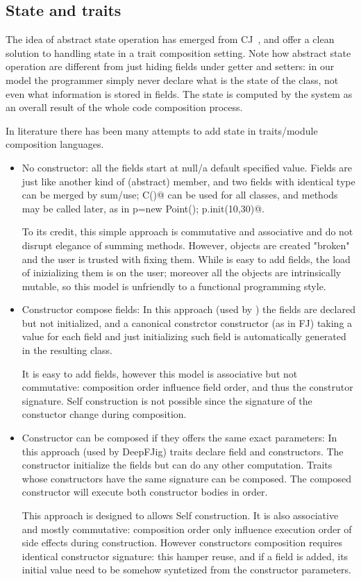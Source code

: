 \subsection{State and traits}

The idea of abstract state operation has emerged from CJ~\cite{wang2016classless}, and offer a clean solution to handling state
in a trait composition setting.
Note how abstract state operation are different from just hiding fields under getter and setters: 
in our model the programmer simply never declare what is the state of the class, not even what information is stored in fields.
The state is computed by the system as an overall result of the whole code composition process.

In literature there has been many attempts to add state in traits/module composition languages.
\begin{itemize}  
\item No constructor: all the fields start at null/a default specified value.
  Fields are just like another kind of (abstract) member, and two fields
  with identical type can be merged by sum/use; \Q@new C()@ can be used for all classes, and \Q@init@ methods may be called later, as in
  \Q@Point p=new Point(); p.init(10,30)@.
  
  To its credit, this simple approach is commutative and associative and do not disrupt elegance of summing methods.
  However, objects are created "broken" and the user is trusted with fixing them.
  While is easy to add fields, the load of inizializing them is on the user; moreover
    all the objects are intrinsically mutable, so this model is unfriendly
    to a functional programming style.
\item Constructor compose fields:
In this approach (used by \cite{FJig}) the fields are declared but not initialized, and
a canonical constrctor constructor (as in FJ) taking a value for each field and just initializing such field
is automatically generated in the resulting class.

It is easy to add fields, however this model is associative but not commutative: composition order influence field order, and thus the construtor signature.
Self construction is not possible 
since the signature of the constuctor change during composition.

\item Constructor can be composed if they offers the same exact parameters:
In this approach (used by DeepFJig) traits declare field and constructors.
The constructor initialize the fields but can do any other computation.
Traits whose constructors have the same signature can be composed.
The composed constructor will execute both constructor bodies in order.

This approach is designed to allows Self construction.
It is also associative and mostly commutative: composition order only influence execution order of side effects during construction.
However constructors composition requires identical constructor signature: this
hamper reuse, and if a field is added, its initial value need to be
somehow syntetized from the constructor parameters.

\end{itemize}

